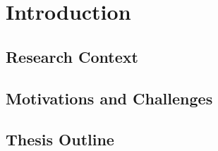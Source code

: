 
\chapter{Introduction}  %

\section[Research Context]{Research Context}

\section[Motivations and Challenges]{Motivations and Challenges}

\section[Thesis Outline]{Thesis Outline}